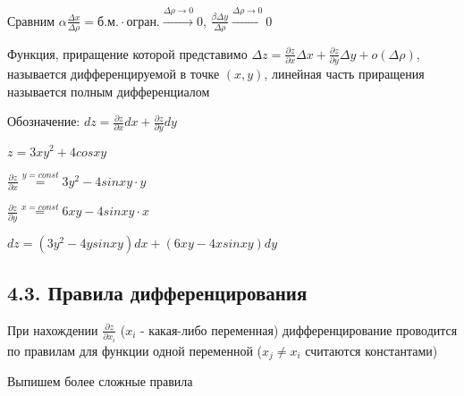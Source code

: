 \documentclass[12pt]{article}
\begin{document}
    Сравним $\displaystyle \alpha \frac{\Delta x}{\Delta \rho} = \text{б.м.} \cdot \text{огран.} \stackrel{\Delta \rho \to 0}{\to} 0$, $\displaystyle \frac{\beta \Delta y}{\Delta \rho} \stackrel{\Delta \rho \to 0}{\to} 0$

    Функция, приращение которой представимо $\displaystyle \Delta z = \frac{\partial z}{\partial x}\Delta x + \frac{\partial z}{\partial y}\Delta y + o(\Delta \rho)$, называется дифференцируемой в точке $\displaystyle (x, y)$,
    линейная часть приращения называется полным дифференциалом

    Обозначение: $\displaystyle dz = \frac{\partial z}{\partial x} dx + \frac{\partial z}{\partial y} dy$

    \Ex $\displaystyle z = 3xy^2 + 4cosxy$

    $\displaystyle \frac{\partial z}{\partial x} \stackrel{y = const}{=} 3y^2 - 4sinxy \cdot y$

    $\displaystyle \frac{\partial z}{\partial y} \stackrel{x = const}{=} 6xy - 4sinxy \cdot x$

    $\displaystyle dz = (3y^2 - 4ysinxy)dx + (6xy - 4xsinxy)dy$
    
    \vspace{8mm}

    \subsection{4.3. Правила дифференцирования}

    \Nota При нахождении $\displaystyle \frac{\partial z}{\partial x_i}$ ($x_i$ - какая-либо переменная) дифференцирование проводится по правилам для функции одной переменной ($x_j \neq x_i$ считаются константами)

    Выпишем более сложные правила

    \hypertarget{derivativeofcomplexfunctionoftwovariables}{}
\end{document}

